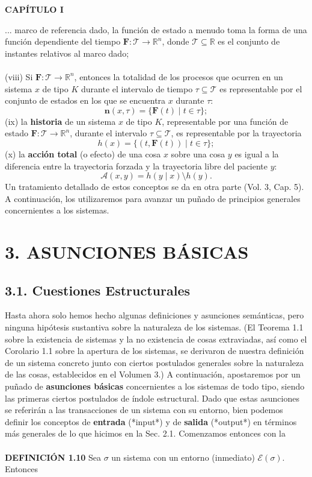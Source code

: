 \newpage
\fancyhf{}
\fancyhead[l]{\thepage}
\begin{center}
{\fontsize{16}{18}\selectfont \textbf{CAPÍTULO I}}
\end{center}
\vspace{0.5cm}

{\fontsize{13}{15}\selectfont
... marco de referencia dado, la función de estado a menudo toma la forma de una función dependiente del tiempo $\mathbf{F}: \mathcal{T} \rightarrow \mathbb{R}^n$, donde $\mathcal{T} \subseteq \mathbb{R}$ es el conjunto de instantes relativos al marco dado;
\\\\
(viii) Si $\mathbf{F}: \mathcal{T} \rightarrow \mathbb{R}^n$, entonces la totalidad de los procesos que ocurren en un sistema $x$ de tipo $K$ durante el intervalo de tiempo $\tau \subseteq \mathcal{T}$ es representable por el conjunto de estados en los que se encuentra $x$ durante $\tau$:
$$ \mathbf{n}(x, \tau) = \{\mathbf{F}(t) \mid t \in \tau\}; $$
(ix) la \textbf{historia} de un sistema $x$ de tipo $K$, representable por una función de estado $\mathbf{F}: \mathcal{T} \rightarrow \mathbb{R}^n$, durante el intervalo $\tau \subseteq \mathcal{T}$, es representable por la trayectoria
$$ h(x) = \{(t, \mathbf{F}(t)) \mid t \in \tau\}; $$
(x) la \textbf{acción total} (o efecto) de una cosa $x$ sobre una cosa $y$ es igual a la diferencia entre la trayectoria forzada y la trayectoria libre del paciente $y$:
$$ \mathcal{A}(x, y) = h(y \mid x) \setminus h(y). $$
Un tratamiento detallado de estos conceptos se da en otra parte (Vol. 3, Cap. 5). A continuación, los utilizaremos para avanzar un puñado de principios generales concernientes a los sistemas.

\section*{\textbf{3. ASUNCIONES BÁSICAS}}

\subsection*{3.1. Cuestiones Estructurales}
Hasta ahora solo hemos hecho algunas definiciones y asunciones semánticas, pero ninguna hipótesis sustantiva sobre la naturaleza de los sistemas. (El Teorema 1.1 sobre la existencia de sistemas y la no existencia de cosas extraviadas, así como el Corolario 1.1 sobre la apertura de los sistemas, se derivaron de nuestra definición de un sistema concreto junto con ciertos postulados generales sobre la naturaleza de las cosas, establecidos en el Volumen 3.) A continuación, apostaremos por un puñado de \textbf{asunciones básicas} concernientes a los sistemas de todo tipo, siendo las primeras ciertos postulados de índole estructural. Dado que estas asunciones se referirán a las transacciones de un sistema con su entorno, bien podemos definir los conceptos de \textbf{entrada} (*input*) y de \textbf{salida} (*output*) en términos más generales de lo que hicimos en la Sec. 2.1. Comenzamos entonces con la
\\\\
\textbf{DEFINICIÓN 1.10} Sea $\sigma$ un sistema con un entorno (inmediato) $\mathcal{E}(\sigma)$. Entonces
}
